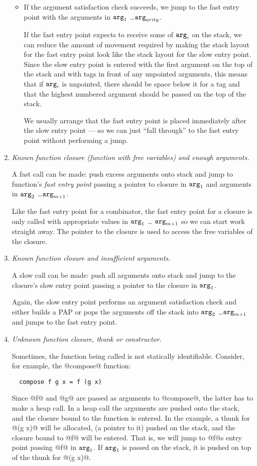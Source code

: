 \documentclass[11pt]{article}
\newcommand{\Arg}[1]{\mbox{${\tt arg}_{#1}$}}
\begin{document}
\begin{enumerate}
\begin{itemize}
\item If the argument satisfaction check succeeds, we jump to the fast
entry point with the arguments in \Arg{1} \ldots \Arg{arity}.

If the fast entry point expects to receive some of \Arg{i} on the
stack, we can reduce the amount of movement required by making the
stack layout for the fast entry point look like the stack layout for
the slow entry point.  Since the slow entry point is entered with the
first argument on the top of the stack and with tags in front of any
unpointed arguments, this means that if \Arg{i} is unpointed, there
should be space below it for a tag and that the highest numbered
argument should be passed on the top of the stack.

We usually arrange that the fast entry point is placed immediately
after the slow entry point --- so we can just ``fall through'' to the
fast entry point without performing a jump.

\end{itemize}


\item \emph{Known function closure (function with free variables) and
enough arguments.}

A fast call can be made: push excess arguments onto stack and jump to
function's \emph{fast entry point} passing a pointer to closure in
\Arg{1} and arguments in \Arg{2} \ldots \Arg{m+1}.

Like the fast entry point for a combinator, the fast entry point for a
closure is only called with appropriate values in \Arg{1} \ldots
\Arg{m+1} so we can start work straight away.  The pointer to the
closure is used to access the free variables of the closure.


\item \emph{Known function closure and insufficient arguments.}

A slow call can be made: push all arguments onto stack and jump to the
closure's slow entry point passing a pointer to the closure in \Arg{1}.

Again, the slow entry point performs an argument satisfaction check
and either builds a PAP or pops the arguments off the stack into
\Arg{2} \ldots \Arg{m+1} and jumps to the fast entry point.


\item \emph{Unknown function closure, thunk or constructor.}

Sometimes, the function being called is not statically identifiable.
Consider, for example, the @compose@ function:
\begin{verbatim}
  compose f g x = f (g x)
\end{verbatim}
Since @f@ and @g@ are passed as arguments to @compose@, the latter has
to make a heap call.  In a heap call the arguments are pushed onto the
stack, and the closure bound to the function is entered.  In the
example, a thunk for @(g x)@ will be allocated, (a pointer to it)
pushed on the stack, and the closure bound to @f@ will be
entered. That is, we will jump to @f@s entry point passing @f@ in
\Arg{1}.  If \Arg{1} is passed on the stack, it is pushed on top of
the thunk for @(g x)@.


\end{enumerate}
\end{document}
